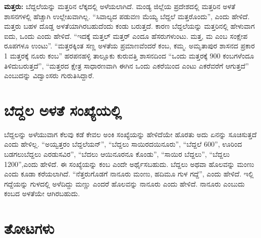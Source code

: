 \textbf{ಮತ್ತರು:} ಬೆದ್ದಲೆಯನ್ನು ಮತ್ತರಿನ ಲೆಕ್ಕದಲ್ಲಿ ಅಳೆಯಲಾಗಿದೆ. ಮಂಡ್ಯ ಜಿಲ್ಲೆಯ ಪ್ರದೇಶದಲ್ಲಿ ಮತ್ತರಿನ ಅಳತೆ ಶಾಸನಗಳಲ್ಲಿ ಹೆಚ್ಚಾಗಿ ಉಲ್ಲೇಖವಾಗಿಲ್ಲ. “ಸಿವಾಲ್ಯದ ಪಡುವಣ ಮೆಯ್ಯ ಬೆದ್ದಲೆ ಮತ್ತರೊಂದು”, ಎಂದು ಹೇಳಿದೆ. ಮತ್ತರು ಬಹಳ ದೊಡ್ಡ ಅಳತೆಯಾಗಿರಬಹುದೆಂದು ಕಂಡು ಬರುತ್ತದೆ. ಕಾರಣ ಬೆದ್ದಲೆಯನ್ನು ಮತ್ತರಿನಲ್ಲಿ ಹೇಳುವಾಗ ಐದು, ಒಂದು ಎಂದು ಹೇಳಿದೆ. “ಇದಕ್ಕೆ ಮತ್ತಲ್​ ಮತ್ತರ್​ ಎಂದೂ ಹೆಸರುಗಳುಂಟು. ಮತ್ತ, ಮ ಎಂಬ ಸಂಕ್ಷೇಪ ರೂಪಗಳೂ ಉಂಟು”. “ಮತ್ತರಕ್ಕಿಂತ ಸಣ್ಣ ಅಳತೆಯ ಪ್ರಮಾಣವೆಂದರೆ ಕಂಬ, ಕಮ್ಮ. ಅಮೃತಾಪುರ ಶಾಸನದ ಪ್ರಕಾರ 1 ಮತ್ತರಕ್ಕೆ ನೂರು ಕಂಬ” ಹರಪನಹಳ್ಳಿ ತಾಲ್ಲೂಕು ಕುರುವತ್ತಿ ಶಾಸನದಿಂದ “ಒಂದು ಮತ್ತರಕ್ಕೆ 900 ಕಂಬಗಳೆಂದೂ ತಿಳಿದುಬರುತ್ತದೆ”, “ಮತ್ತರದ ಕ್ಷೇತ್ರ ಸಾಧಾರಣವಾಗಿ ಈಗಿನ ಒಂದು ಎಕರೆಯಿಂದ ಎಂಟು ಎಕರೆವರೆಗೆ ಆಗುತ್ತದೆ” ಎಂಬುದನ್ನು ವಿದ್ವಾಂಸರು ಗುರುತಿಸಿದ್ದಾರೆ.


\section{ಬೆದ್ದಲ ಅಳತೆ ಸಂಖ್ಯೆಯಲ್ಲಿ}

ಬೆದ್ದಲನ್ನು ಅಳೆಯುವಾಗ ಕೆಲವು ಕಡೆ ಕೇವಲ ಅಂಕಿ ಸಂಖ್ಯೆಯನ್ನು ಹೇಳಿದೆಯೇ ಹೊರತು ಅದು ಏನನ್ನು ಸೂಚಿಸುತ್ತದೆ ಎಂದು ಹೇಳಿಲ್ಲ. “ಅಯ್ವತ್ತರಂ ಬೆದ್ದಲೆಯನ್​”, “ಬೆದ್ದಲು ಸಾಯಿರದಯಿನೂರು”, “ಬೆದ್ದಲೆ 600”, ಊರಿಂದ ಬಡಗಲುಬೆದ್ದಲು ಎರಡುಸವಿರ”, “ಬೆದಲು ಆಯಿನೂರನೂ ಕೊಂಡು”, “ಸಾಯಿರ ಬೆದ್ದಲು”, “ಬೆದ್ದಲು 1200”,ಎಂದು ಹೇಳಿದೆ. ಈ ಸಂಖ್ಯೆಯನ್ನು ಕಂಬ ಎಂದೇ ಅರ್ಥೈಸಬಹುದು. ಬೆದ್ದಲು ಅಥವಾ ಹೊಲವನ್ನು ಮಂಣು ಎಂದು ಕೂಡಾ ಕರೆಯಲಾಗಿದೆ. “ನೆತ್ತರುಗೊಡಗೆ ನಾನೂರು ಮಂಣು, ಹದಿಮೂ ಗುಳ ಗದ್ದೆ”, ಎಂದು ಹೇಳಿದೆ. ಇಲ್ಲಿ ಗದ್ದೆಯನ್ನು ಗುಳದಲ್ಲಿ ಅಳೆದಿದ್ದು ಮಣ್ಣು ಎಂದರೆ ಹೊಲವನ್ನು ನಾನೂರು ಎಂದು ಹೇಳಿದೆ. ನಾನೂರು ಎಂಬುದು ಕಂಬದ ಅಳತೆಯೇ ಆಗಿರಬಹುದು.


\section{ತೋಟಗಳು}

